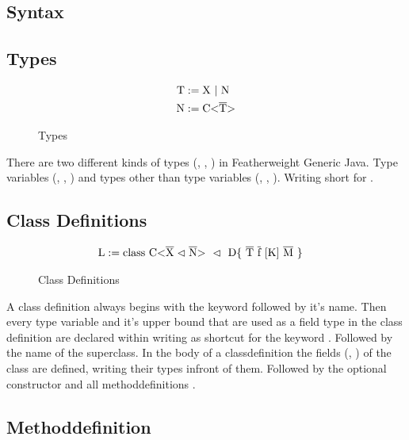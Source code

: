 \subsection{Syntax}

\subsection{Types}

\begin{figure}
    \begin{align*}
        \text{T} &:= \text{X} \ | \ \text{N}
        \\
        \text{N} &:= \text{C} \text{<} \overline{\text{T}} \text{>}
    \end{align*}
    \caption{Types}
    \label{types}
\end{figure}

There are two different kinds of types (, , ) in Featherweight Generic Java.
Type variables (, , ) and types other than type variables (, , ).
Writing  short for .

\subsection{Class Definitions}

\begin{figure}
    \begin{align*}
        \text{L} &:= \text{class} \ \text{C} \text{<} \overline{\text{X}} \vartriangleleft \overline{\text{N}} \text{>} \ \vartriangleleft \ \text{D} \{ \ \overline{\text{T}} \ \overline{\text{f}} \ [\text{K}] \ \overline{\text{M}} \ \}
    \end{align*}
    \caption{Class Definitions}
    \label{classd_efinitions}
\end{figure}

A class definition  always begins with the keyword  followed by it's name. Then every type variable and it's upper bound that are used as a field type in the class definition are declared within \inl{<>} writing \inl{\vartriangleleft} as shortcut for the keyword .
Followed by the name of the superclass. In the body of a classdefinition the fields (, ) of the class are defined, writing their types infront of them. Followed by the optional constructor  and all methoddefinitions .

\subsection{Methoddefinition}

